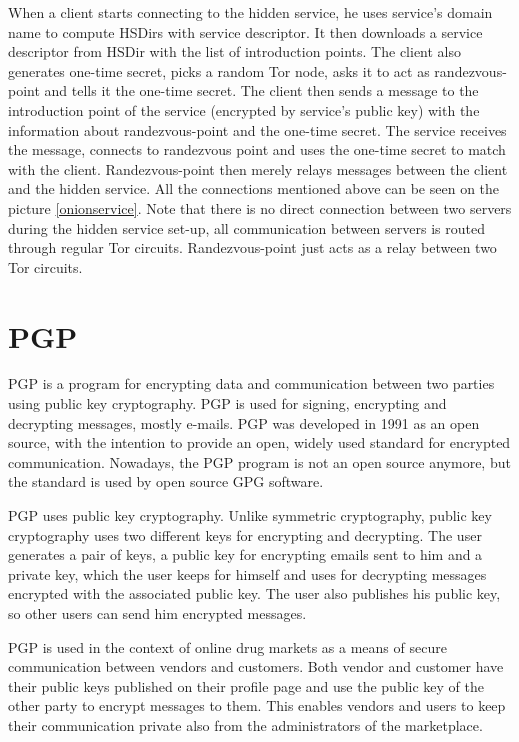 \documentclass[
  digital, %
  table,   %
  lof,     %
  lot,     %
  oneside
]{fithesis3}
\begin{document}
When a client starts connecting to the hidden service, he uses service's domain name to compute HSDirs with service descriptor. It then downloads a service descriptor from HSDir with the list
of introduction points. The client also generates one-time secret, picks a random Tor node, asks
it to act as randezvous-point and tells it the one-time secret. 
The client then sends a message to the introduction point of the service (encrypted by service's public key)
with the information about randezvous-point and the one-time secret. The service receives the message, connects to randezvous point and uses the one-time secret to match with the client.
Randezvous-point then merely relays messages between the client and the hidden service.
All the connections mentioned above can be seen on the picture \ref{onionservice}.
Note that there is no direct connection between two servers during the hidden service set-up,
all communication between servers is routed through regular Tor circuits.
Randezvous-point just acts as a relay between two Tor circuits.

\section{PGP}

PGP \cite{Zimmermann:1995:OPU:202735} is a program for encrypting data
and communication between two parties using public key cryptography.
PGP is used for signing, encrypting and decrypting messages, mostly e-mails.
PGP was developed in 1991 as an open source, with the intention 
to provide an open, widely used standard for encrypted communication.
Nowadays, the PGP program is not an open source anymore, but the standard is used by open source GPG software.

PGP uses public key cryptography. Unlike symmetric cryptography, public key cryptography
uses two different keys for encrypting and decrypting.
The user generates a pair of keys, a public key for encrypting emails sent to him and a private key, which the user
 keeps for himself and uses for decrypting messages encrypted with the associated public key.
 The user also publishes his public key, so other users can send him encrypted messages.

PGP is used in the context of online drug markets as a means of secure communication between vendors and customers.
Both vendor and customer have their public keys published on their profile page and use the public key of the other
party to encrypt messages to them. This enables vendors and users to keep their communication private also from the administrators of the marketplace.
\end{document}
